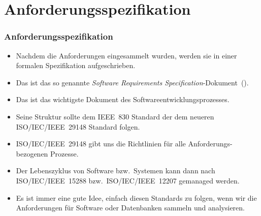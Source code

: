\documentclass[aspectratio=169,mathserif,notheorems]{beamer}%
\begin{document}
\section{Anforderungsspezifikation}%
%
\begin{frame}%
\frametitle{Anforderungsspezifikation}%
%
\begin{itemize}%
\item Nachdem die Anforderungen eingesammelt wurden, werden sie in einer formalen Spezifikation aufgeschrieben.%
%
\item<2-> Das ist das so genannte \emph{Software Requirements Specification}-Dokument~().%
%
\item<3-> Das  ist das wichtigste Dokument des Softwareentwicklungsprozesses.%
%
\item<4-> Seine Struktur sollte dem IEEE~830 Standard\cite{IEEE1998IRPFSRS} der dem neueren ISO/IEC/IEEE~29148 Standard folgen\cite{ISOIECIEEE2018SASELCPRE}.%
%
\item<5-> ISO/IEC/IEEE~29148\cite{ISOIECIEEE2018SASELCPRE} gibt uns die Richtlinien für alle Anforderungs-bezogenen Prozesse.%
%
\item<6-> Der Lebenszyklus von Software bzw.\ Systemen kann dann nach ISO/IEC/IEEE~15288\cite{ISOIECIEEE2023SASESLCP} bzw.\ ISO/IEC/IEEE~12207\cite{ISOIECIEEE2017SASESLCP} gemanaged werden.%
%
\item<7-> Es ist immer eine gute Idee, einfach diesen Standards zu folgen, wenn wir die Anforderungen für Software oder Datenbanken sammeln und analysieren.%
\end{itemize}%
\end{frame}%
%
\end{document}
